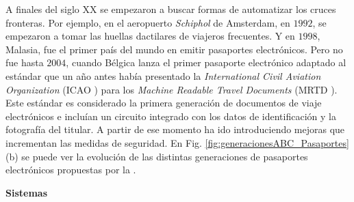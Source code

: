 A finales del siglo XX se empezaron a buscar formas de automatizar los cruces fronteras. Por ejemplo, en el aeropuerto \textit{Schiphol} de Amsterdam, en $1992$, se empezaron a tomar las huellas dactilares de viajeros frecuentes. Y en $1998$, Malasia, fue el primer país del mundo en emitir pasaportes electrónicos. Pero no fue hasta $2004$, cuando Bélgica lanza el primer pasaporte electrónico adaptado al estándar que un año antes había presentado la \textit{International Civil Aviation Organization} (\gls{ICAO} \cite{ICAOOnline}) para los \textit{Machine Readable Travel Documents} (\gls{MRTD} \cite{doc20069303}). Este estándar es considerado la primera generación de documentos de viaje electrónicos e incluían un circuito integrado con los datos de identificación y la fotografía del titular. A partir de ese momento  ha ido introduciendo mejoras que incrementan las medidas de seguridad. En Fig. \ref{fig:generacionesABC_Pasaportes} (b) se puede ver la evolución de las distintas generaciones de pasaportes electrónicos propuestas por la .

\medskip
\textbf{Sistemas } 
\medskip





